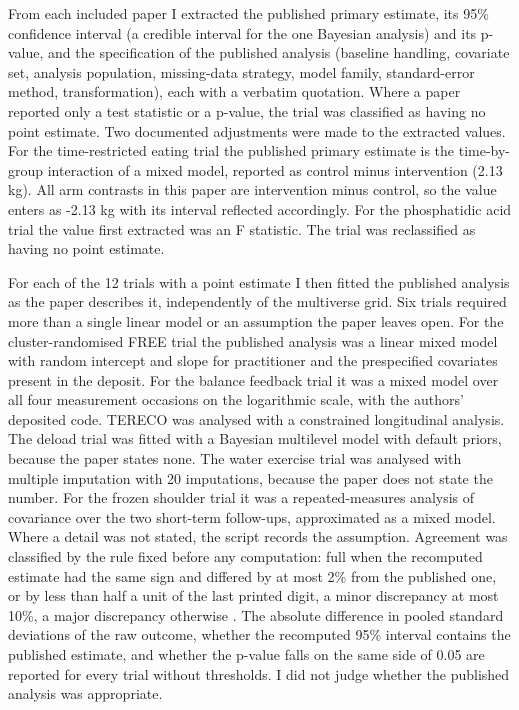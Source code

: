 From each included paper I extracted the published primary estimate, its 95\% confidence interval (a credible interval for the one Bayesian analysis) and its p-value, and the specification of the published analysis (baseline handling, covariate set, analysis population, missing-data strategy, model family, standard-error method, transformation), each with a verbatim quotation. Where a paper reported only a test statistic or a p-value, the trial was classified as having no point estimate. Two documented adjustments were made to the extracted values. For the time-restricted eating trial \cite{Yu_2025} the published primary estimate is the time-by-group interaction of a mixed model, reported as control minus intervention (2.13 kg). All arm contrasts in this paper are intervention minus control, so the value enters as -2.13 kg with its interval reflected accordingly. For the phosphatidic acid trial \cite{Escalante_2016} the value first extracted was an F statistic. The trial was reclassified as having no point estimate.

For each of the 12 trials with a point estimate I then fitted the published analysis as the paper describes it, independently of the multiverse grid. Six trials required more than a single linear model or an assumption the paper leaves open. For the cluster-randomised FREE trial \cite{Darlow_2019} the published analysis was a linear mixed model with random intercept and slope for practitioner and the prespecified covariates present in the deposit. For the balance feedback trial \cite{Suarez_2026} it was a mixed model over all four measurement occasions on the logarithmic scale, with the authors' deposited code. TERECO \cite{Li_2022} was analysed with a constrained longitudinal analysis. The deload trial \cite{Coleman_2024} was fitted with a Bayesian multilevel model with default priors, because the paper states none. The water exercise trial \cite{Navas_2021} was analysed with multiple imputation with 20 imputations, because the paper does not state the number. For the frozen shoulder trial \cite{Sharma_2016} it was a repeated-measures analysis of covariance over the two short-term follow-ups, approximated as a mixed model. Where a detail was not stated, the script records the assumption. Agreement was classified by the rule fixed before any computation: full when the recomputed estimate had the same sign and differed by at most 2\% from the published one, or by less than half a unit of the last printed digit, a minor discrepancy at most 10\%, a major discrepancy otherwise \cite{Hardwicke_2021,Naudet_2018}. The absolute difference in pooled standard deviations of the raw outcome, whether the recomputed 95\% interval contains the published estimate, and whether the p-value falls on the same side of 0.05 are reported for every trial without thresholds. I did not judge whether the published analysis was appropriate.

